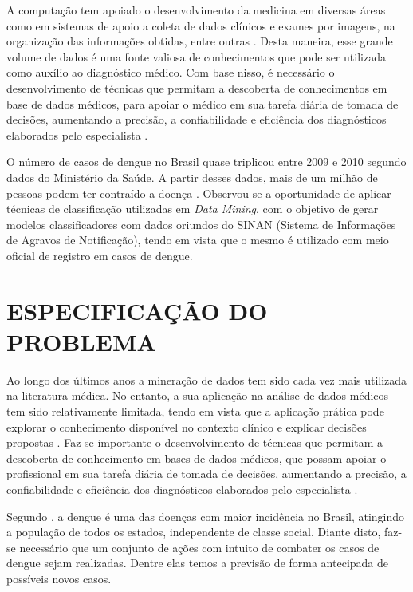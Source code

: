 \documentclass[
	12pt,				%
	openright,			%
	oneside,	
	a4paper,				%
	english,				%
	brazil				%
]{abntex2/abntex2} %
\begin{document}
	A computação tem apoiado o desenvolvimento da medicina em diversas áreas como em sistemas de apoio a coleta de dados clínicos e exames por imagens, na organização das informações obtidas, entre outras \cite{costa:2012}. Desta maneira, esse grande volume de dados é uma fonte valiosa de conhecimentos que pode ser utilizada como auxílio ao diagnóstico médico. Com base nisso, é necessário o desenvolvimento de técnicas que permitam a descoberta de conhecimentos em base de dados médicos, para apoiar o médico em sua tarefa diária de tomada de decisões, aumentando a precisão, a confiabilidade e eficiência dos diagnósticos elaborados pelo especialista \cite{costa:2012}.
	
	O número de casos de dengue no Brasil quase triplicou entre 2009 e 2010 segundo dados do Ministério da Saúde. A partir desses dados, mais de um milhão de pessoas podem ter contraído a doença \cite{santos:2011}. Observou-se a oportunidade de aplicar técnicas de classificação utilizadas em \textit{Data Mining}, com o objetivo de gerar modelos classificadores com dados oriundos do SINAN (Sistema de Informações de Agravos de Notificação), tendo em vista que o mesmo é utilizado com meio oficial de registro em casos de dengue.
	\section{ESPECIFICAÇÃO DO PROBLEMA}
	
		Ao longo dos últimos anos a mineração de dados tem sido cada vez mais utilizada na literatura médica. No entanto, a sua aplicação na análise de dados médicos tem sido relativamente limitada, tendo em vista que a aplicação prática pode explorar o conhecimento disponível no contexto clínico e explicar decisões propostas \cite{bellazzi:2008}. Faz-se importante o desenvolvimento de técnicas que permitam a descoberta de conhecimento em bases de dados médicos, que possam apoiar o profissional em sua tarefa diária de tomada de decisões, aumentando a precisão, a confiabilidade e eficiência dos diagnósticos elaborados pelo especialista \cite{costa:2012}.
		
		Segundo \cite{saude:2013}, a dengue é uma das doenças com maior incidência no Brasil, atingindo a população de todos os estados, independente de classe social. Diante disto, faz-se necessário que um conjunto de ações com intuito de combater os casos de dengue sejam realizadas. Dentre elas temos a previsão de forma antecipada de possíveis novos casos.
	
\end{document}
